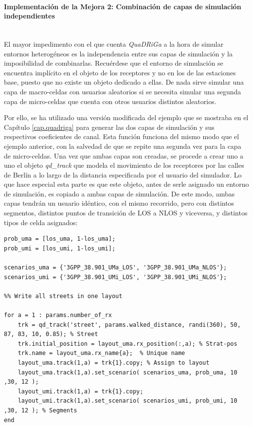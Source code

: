 \paragraph{Implementación de la Mejora 2: Combinación de capas de simulación independientes} \mbox{} \\

El mayor impedimento con el que cuenta \textit{QuaDRiGa} a la hora de simular entornos heterogéneos es la independencia entre sus capas de simulación y la imposibilidad de combinarlas. Recuérdese que el entorno de simulación se encuentra implícito en el objeto de los receptores y no en los de las estaciones base, puesto que no existe un objeto dedicado a ellas. De nada sirve simular una capa de macro-celdas con usuarios aleatorios si se necesita simular una segunda capa de micro-celdas que cuenta con otros usuarios distintos aleatorios.

Por ello, se ha utilizado una versión modificada del ejemplo que se mostraba en el Capítulo \ref{cap.quadriga} para generar las dos capas de simulación y sus respectivos coeficientes de canal. Esta función funciona del mismo modo que el ejemplo anterior, con la salvedad de que se repite una segunda vez para la capa de micro-celdas. Una vez que ambas capas son creadas, se procede a crear uno a uno el objeto \textit{qd\_track} que modela el movimiento de los receptores por las calles de Berlín a lo largo de la distancia especificada por el usuario del simulador. Lo que hace especial esta parte es que este objeto, antes de serle asignado un entorno de simulación, es copiado a ambas capas de simulación. De este modo, ambas capas tendrán un usuario idéntico, con el mismo recorrido, pero con distintos segmentos, distintos puntos de transición de LOS a NLOS y viceversa, y distintos tipos de celda asignados:

\begin{lstlisting}[style=Matlab-editor, basicstyle=\tiny]
prob_uma = [los_uma, 1-los_uma];
prob_umi = [los_umi, 1-los_umi];

scenarios_uma = {'3GPP_38.901_UMa_LOS', '3GPP_38.901_UMa_NLOS'};
scenarios_umi = {'3GPP_38.901_UMi_LOS', '3GPP_38.901_UMi_NLOS'};

%% Write all streets in one layout

for a = 1 : params.number_of_rx
    trk = qd_track('street', params.walked_distance, randi(360), 50, 87, 83, 10, 0.85); % Street
    trk.initial_position = layout_uma.rx_position(:,a); % Strat-pos
    trk.name = layout_uma.rx_name{a};  % Unique name
    layout_uma.track(1,a) = trk{1}.copy; % Assign to layout
    layout_uma.track(1,a).set_scenario( scenarios_uma, prob_uma, 10 ,30, 12 );
    layout_umi.track(1,a) = trk{1}.copy;
    layout_umi.track(1,a).set_scenario( scenarios_umi, prob_umi, 10 ,30, 12 ); % Segments
end
\end{lstlisting}

